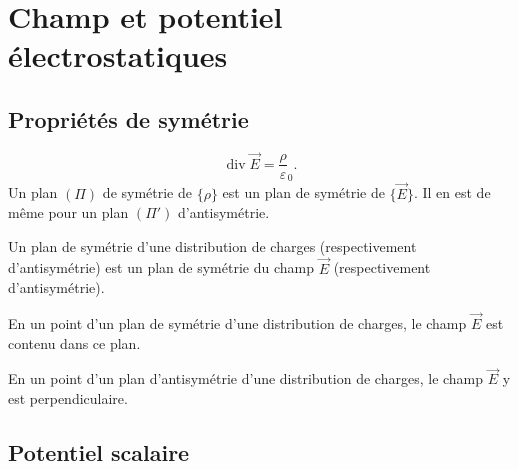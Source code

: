 \documentclass[11pt,a4paper]{article}
\newcommand{\dd}{\mathrm d}
\newcommand{\stars}[1]{\mathord{\star}\ifnum#1>1\mkern5mu\mathord{\star}\fi\ifnum#1>2\mkern5mu\mathord{\star}\fi\ifnum#1>3\mkern5mu\mathord{\star}\fi\ifnum#1>4\mkern5mu\mathord{\star}\fi\ifnum#1>5\mkern5mu\mathord{\star}\fi}
\newenvironment{result}[1][4]{\begin{cadre}[etoiles={\stars{#1}}]}{\end{cadre}}
\newcommand{\divg}{\operatorname{div}}\newcommand{\sy}{\operatorname{sym}}
\newcommand{\eps}{\varepsilon_0}\newcommand{\E}{\vec E}\newcommand{\dS}{\dd\vec S}\newcommand{\dM}{\dd\vec M}
\begin{document}
\section{Champ et potentiel électrostatiques}
\subsection{Propriétés de symétrie}
\[\divg\E=\frac\rho\eps.\]
Un plan $(\Pi)$ de symétrie de $\{\rho\}$ est un plan de symétrie de $\{\E\}$. Il en est de même pour un plan $(\Pi')$ d'antisymétrie.
\begin{result}
Un plan de symétrie d'une distribution de charges (respectivement d'antisymétrie) est un plan de symétrie du champ $\E$ (respectivement d'antisymétrie).
\end{result}
\begin{cadre}En un point d'un plan de symétrie d'une distribution de charges, le champ $\E$ est contenu dans ce plan.

En un point d'un plan d'antisymétrie d'une distribution de charges, le champ $\E$ y est perpendiculaire.\end{cadre}
\subsection{Potentiel scalaire}
\end{document}

